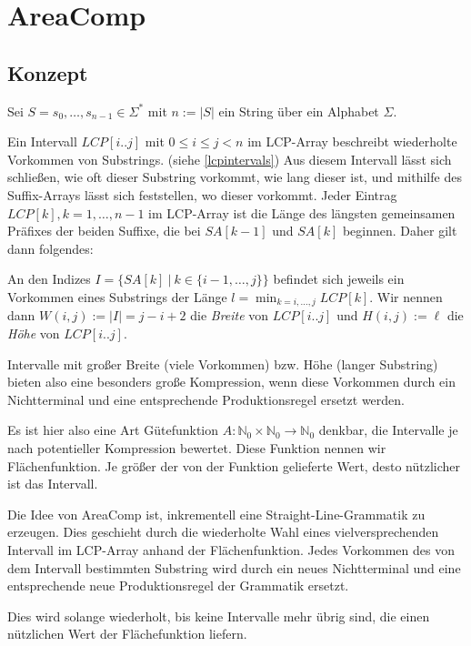 \chapter{AreaComp}
\label{areacomp}

\section{Konzept}
\label{areacompconcept}

Sei $S = s_0, \dots, s_{n-1} \in \Sigma^*$ mit $n := |S|$ ein String über ein Alphabet $\Sigma$.

Ein Intervall $LCP[i..j]$ mit $0 \leq i \leq j < n$ im LCP-Array beschreibt wiederholte Vorkommen von Substrings. (siehe \autoref{lcpintervals}) Aus diesem Intervall lässt sich schließen, wie oft dieser Substring vorkommt, wie lang dieser ist, und mithilfe des Suffix-Arrays lässt sich feststellen, wo dieser vorkommt. Jeder Eintrag $LCP[k], k = 1,\dots,n-1$ im LCP-Array ist die Länge des längsten gemeinsamen Präfixes der beiden Suffixe, die bei $SA[k-1]$ und $SA[k]$ beginnen. Daher gilt dann folgendes:

An den Indizes $I = \{SA[k]\ |\ k \in \{i-1, \dots, j\}\}$ befindet sich jeweils ein Vorkommen eines Substrings der Länge $l = \min_{k = i, \dots, j} LCP[k]$. Wir nennen dann $W(i, j) := |I| = j - i + 2$ die \emph{Breite} von $LCP[i..j]$ und $H(i, j) := \ell$ die \emph{Höhe} von $LCP[i..j]$.

Intervalle mit großer Breite (viele Vorkommen) bzw. Höhe (langer Substring) bieten also eine besonders große Kompression, wenn diese Vorkommen durch ein Nichtterminal und eine entsprechende Produktionsregel ersetzt werden.

Es ist hier also eine Art Gütefunktion $A: \mathbb{N}_0 \times \mathbb{N}_0 \rightarrow \mathbb{N}_0$ denkbar, die Intervalle je nach potentieller Kompression bewertet. Diese Funktion nennen wir Flächenfunktion. Je größer der von der Funktion gelieferte Wert, desto nützlicher ist das Intervall.

Die Idee von AreaComp ist, inkrementell eine Straight-Line-Grammatik zu erzeugen. Dies geschieht durch die wiederholte Wahl eines vielversprechenden Intervall im LCP-Array anhand der Flächenfunktion. Jedes Vorkommen des von dem Intervall bestimmten Substring wird durch ein neues Nichtterminal und eine entsprechende neue Produktionsregel der Grammatik ersetzt.

Dies wird solange wiederholt, bis keine Intervalle mehr übrig sind, die einen nützlichen Wert der Flächefunktion liefern.

